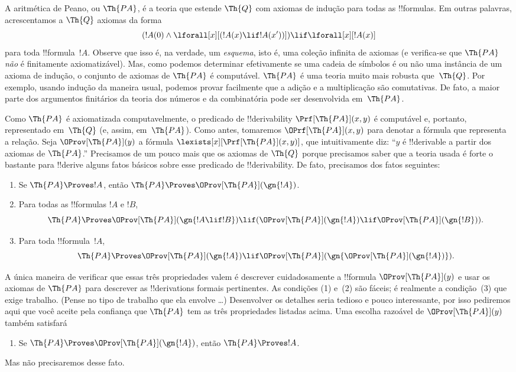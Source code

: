 \documentclass[../../../include/open-logic-section]{subfiles}
\begin{document}


A aritmética de Peano, ou $\Th{PA}$, é a teoria que estende $\Th{Q}$ com
axiomas de indução para todas as !!{formula}s. Em outras palavras,
acrescentamos a $\Th{Q}$ axiomas da forma
\[
(!A(0) \land \lforall[x][(!A(x) \lif !A(x'))]) \lif \lforall[x][!A(x)]
\]
para toda !!{formula}~$!A$. Observe que isso é, na verdade, um
\emph{esquema}, isto é, uma coleção infinita de axiomas (e verifica-se que
$\Th{PA}$ {\em não} é finitamente axiomatizável). Mas, como podemos
determinar efetivamente se uma cadeia de símbolos é ou não uma instância de
um axioma de indução, o conjunto de axiomas de $\Th{PA}$ é computável.
$\Th{PA}$ é uma teoria muito mais robusta que~$\Th{Q}$. Por exemplo, usando
indução da maneira usual, podemos provar facilmente que a adição e a
multiplicação são comutativas. De fato, a maior parte dos argumentos
finitários da teoria dos números e da combinatória pode ser desenvolvida
em~$\Th{PA}$.

Como $\Th{PA}$ é axiomatizada computavelmente, o predicado de
!!{derivability} $\Prf[\Th{PA}](x,y)$ é computável e, portanto,
representado em~$\Th{Q}$ (e, assim, em~$\Th{PA}$). Como antes, tomaremos
$\OPrf[\Th{PA}](x,y)$ para denotar a fórmula que representa a relação. Seja
$\OProv[\Th{PA}](y)$ a fórmula
$\lexists[x][\Prf[\Th{PA}](x,y)]$, que intuitivamente diz: ``$y$ é
!!{derivable} a partir dos axiomas de $\Th{PA}$.'' Precisamos de um pouco
mais que os axiomas de $\Th{Q}$ porque precisamos saber que a teoria usada
é forte o bastante para !!{derive} alguns fatos básicos sobre esse
predicado de !!{derivability}. De fato, precisamos dos fatos seguintes:
\begin{enumerate}
\item[P1.] Se $\Th{PA} \Proves !A$, então $\Th{PA} \Proves
  \OProv[\Th{PA}](\gn{!A})$.
\item[P2.] Para todas as !!{formula}s $!A$ e $!B$,
  \[
  \Th{PA} \Proves \OProv[\Th{PA}](\gn{!A \lif !B}) \lif
  (\OProv[\Th{PA}](\gn{!A}) \lif \OProv[\Th{PA}](\gn{!B})).
  \]
\item[P3.] Para toda !!{formula}~$!A$,
  \[
  \Th{PA} \Proves \OProv[\Th{PA}](\gn{!A})
  \lif \OProv[\Th{PA}](\gn{\OProv[\Th{PA}](\gn{!A})}).
  \]
\end{enumerate}
A única maneira de verificar que essas três propriedades valem é descrever
cuidadosamente a !!{formula} $\OProv[\Th{PA}](y)$ e usar os axiomas de
$\Th{PA}$ para descrever as !!{derivation}s formais pertinentes. As
condições (1) e~(2) são fáceis; é realmente a condição~(3) que exige
trabalho. (Pense no tipo de trabalho que ela envolve \dots) Desenvolver os
detalhes seria tedioso e pouco interessante, por isso pediremos aqui que
você aceite pela confiança que $\Th{PA}$ tem as três propriedades listadas
acima. Uma escolha razoável de $\OProv[\Th{PA}](y)$ também satisfará
\begin{enumerate}
\item[P4.] Se $\Th{PA} \Proves \OProv[\Th{PA}](\gn{!A})$, então
  $\Th{PA} \Proves !A$.
\end{enumerate}
Mas não precisaremos desse fato.
\end{document}
